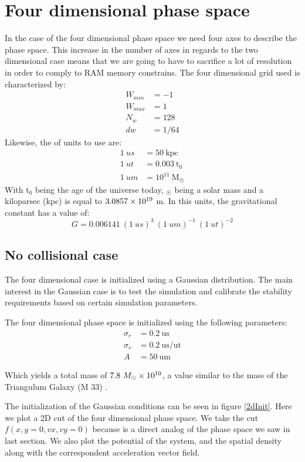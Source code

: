 \section{Four dimensional phase space}
In the case of the four dimensional phase space we need four axes to describe the phase space. This increase in the number of axes in regards to the two dimensional case means that we are going to have to sacrifice a lot of resolution in order to comply to RAM memory constrains. The four dimensional grid used is characterized by:
\begin{align}
W_{min} &= -1\\
W_{max} &= 1\\
N_w &= 128\\
dw &= 1/64
\end{align}
Likewise, the of units to use are:
\begin{align}
1\ us &= 50\ \text{kpc}\\
1\ ut &= 0.003 \ \text{t}_0\\
1\ um &= 10^{11} \ \text{M}_{\astrosun}
\end{align}
With t$_0$ being the age of the universe today, $_{\astrosun}$ being a solar mass and a kiloparsec (kpc) is equal to $3.0857\times 10^{19}$ m. In this units, the gravitational constant has a value of:
\begin{equation}
G = 0.006141 \ (1 \ us)^3 \ (1 \ um)^{-1} \ (1 \ ut)^{-2}
\end{equation}
\subsection{No collisional case}
The four dimensional case is initialized using a Gaussian distribution. The main interest in the Gaussian case is to test the simulation and calibrate the stability requirements based on certain simulation parameters. 

The four dimensional phase space is initialized using the following parameters:
\begin{align}
\sigma_r &= 0.2 \ \text{us} \\
\sigma_v &= 0.2 \ \text{us} / \text{ut} \\
A &= 50  \ \text{um}
\end{align}

Which yields a total mass of $7.8 \ M_{\odot} \e{10}$, a value similar to the mass of the Triangulum Galaxy (M 33) \cite{2003MNRAS342199C}.

The initialization of the Gaussian conditions can be seen in figure \ref{2dInit}. Here we plot a 2D cut of the four dimensional phase space. We take the cut $f(x,y=0,vx,vy=0)$ because is a direct analog of the phase space we saw in last section. We also plot the potential of the system, and the spatial density along with the correspondent acceleration vector field.


